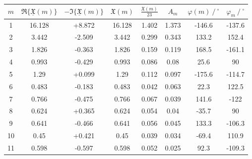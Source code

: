 \begin{lstlistings}
\begin{tabular}{cccccccc}
    {$m$} & {$\Re\{\underline{\mathfrak{X}}(m)\}$} & {$-\Im\{\underline{\mathfrak{X}}(m)\}$} & {$\mathfrak{X}(m)$} & 
    {$\frac{\mathfrak{X}(m)}{23}$} & {$A_m$} & {$\varphi(m)\ /\ ^{\circ}$} & {$\varphi_m\ /\ ^{\circ}$} \\ \midrule
    1  & 16.128 & +8.872 & 16.128 & 1.402 & 1.373 & -146.6 & -137.6 \\
    2  & 3.442  & -2.509 & 3.442  & 0.299 & 0.343 & 133.2  & 152.4  \\
    3  & 1.826  & -0.363 & 1.826  & 0.159 & 0.119 & 168.5  & -161.1 \\
    4  & 0.993  & -0.429 & 0.993  & 0.086 & 0.08  & 25.6   & 90     \\ 
    5  & 1.29   & +0.099 & 1.29   & 0.112 & 0.097 & -175.6 & -114.7 \\
    6  & 0.483  & -0.183 & 0.483  & 0.042 & 0.063 & 22.3   & 122.5  \\
    7  & 0.766  & -0.475 & 0.766  & 0.067 & 0.039 & 141.6  & -122   \\
    8  & 0.624  & +0.365 & 0.624  & 0.054 & 0.04  & -35.7  & 90     \\
    9  & 0.641  & -0.466 & 0.641  & 0.056 & 0.045 & 133.3  & -106.3 \\
    10 & 0.45   & +0.421 & 0.45   & 0.039 & 0.034 & -69.4  & 110.9  \\
    11 & 0.598  & -0.597 & 0.598  & 0.052 & 0.025 & 92.3   & -109.3 \\ 
\end{tabular}
\end{lstlistings}